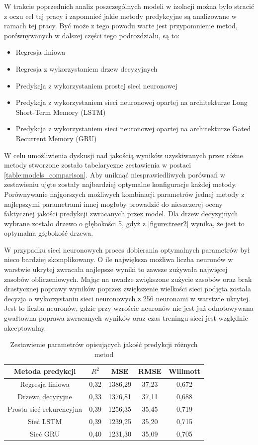 \documentclass[10pt,a4paper]{article}
\begin{document}
W trakcie poprzednich analiz poszczególnych modeli w izolacji można było stracić z oczu cel tej pracy i zapomnieć jakie metody predykcyjne są analizowane w ramach tej pracy. Być może z tego powodu warte jest przypomnienie metod, porównywanych w dalszej części tego podrozdziału, są to:
\begin{itemize}
	\item Regresja liniowa
	\item Regresja z wykorzystaniem drzew decyzyjnych
	\item Predykcja z wykorzystaniem prostej sieci neuronowej
	\item Predykcja z wykorzystaniem sieci neuronowej opartej na architekturze Long Short-Term Memory (LSTM)
	\item Predykcja z wykorzystaniem sieci neuronowej opartej na architekturze Gated Recurrent Memory (GRU)
\end{itemize}

W celu umożliwienia dyskusji nad jakością wyników uzyskiwanych przez różne metody stworzone zostało tabelaryczne zestawienia w postaci \autoref{table:models_comparison}. Aby uniknąć niesprawiedliwych porównań w zestawieniu ujęte zostały najbardziej optymalne konfiguracje każdej metody. Porównywanie najgorszych możliwych kombinacji parametrów jednej metody z najlepszymi parametrami innej mogłoby prowadzić do nieszczerej oceny faktycznej jakości predykcji zwracanych przez model. Dla drzew decyzyjnych wybrane zostało drzewo o głębokości 5, gdyż z \autoref{figure:treer2} wynika, że jest to optymalna głębokość drzewa. 

W przypadku sieci neuronowych proces dobierania optymalnych parametrów był nieco bardziej skomplikowany. O ile największa możliwa liczba neuronów w warstwie ukrytej zwracała najlepsze wyniki to zawsze zużywała najwięcej zasobów obliczeniowych. Mając na uwadze zwiększone zużycie zasobów oraz brak drastycznej poprawy wyników poprzez zwiększenie wielkości sieci podjęta została decyzja o wykorzystaniu sieci neuronowych z 256 neuronami w warstwie ukrytej. Jest to liczba neuronów, gdzie przy wzroście neuronów nie jest już odnotowywana gwałtowna poprawa zwracanych wyników oraz czas treningu sieci jest względnie akceptowalny.


\begin{table}[h!]
	\centering
	\begin{tabular}{|c|c|c|c|c|}
		\hline
		Metoda predykcji & $R^2$ & MSE & RMSE & Willmott \\
		\hline
		Regresja liniowa		 & 0,32  & 1386,29 & 37,23 & 0,672 \\
		Drzewa decyzyjne 		 & 0,33  & 1376,81 & 37,11 & 0,688 \\
		Prosta sieć rekurencyjna & 0,39  & 1256,35 & 35,45 & 0,719 \\
		Sieć LSTM 				 & 0,39  & 1239,25 & 35,20 & 0,715 \\
		Sieć GRU 				 & 0,40  & 1231,30 & 35,09 & 0,705 \\
		\hline
	\end{tabular}
	\caption{Zestawienie parametrów opisujących jakość predykcji różnych metod}
	\label{table:models_comparison}
\end{table}
\end{document}
